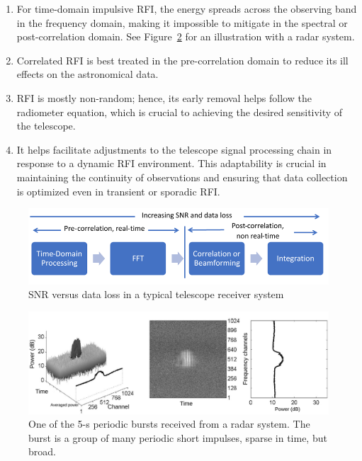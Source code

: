 \begin{enumerate}
\item For time-domain impulsive RFI, the energy spreads across the observing band in the frequency domain, making it impossible to mitigate in the spectral or post-correlation domain.  See Figure~\ref{fig:rfi_example_radar} for an illustration with a radar system.

\item Correlated RFI is best treated in the pre-correlation domain to reduce its ill effects on the astronomical data.

\item RFI is mostly non-random; hence, its early removal helps follow the radiometer equation, which is crucial to achieving the desired sensitivity of the telescope.

\item It helps facilitate adjustments to the telescope signal processing chain in response to a dynamic RFI environment. This adaptability is crucial in maintaining the continuity of observations and ensuring that data collection is optimized even in transient or sporadic RFI.
\end{enumerate}


\begin{figure}
    \centering
    \includegraphics[scale=0.8]{Hardware Excision Techniques/figures/rt.jpg}
    \caption{SNR versus data loss in a typical telescope receiver system}
    \label{fig:real-time-rfi}
\end{figure}


\begin{figure}
    \centering
    \includegraphics[height=.20\textheight]{figures/radar.pdf}
    \caption{One of the 5-s periodic bursts received from a radar system.  The burst is a group of many periodic short impulses, sparse in time, but broad.  }
    \label{fig:rfi_example_radar}
\end{figure}

